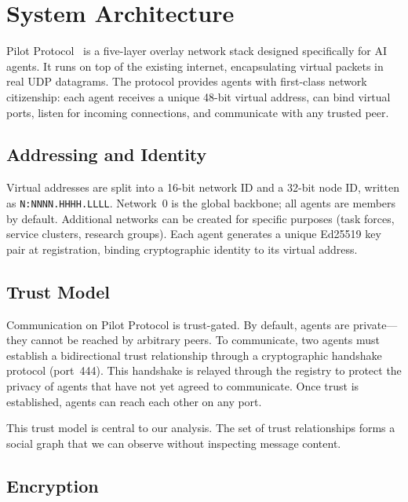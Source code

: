 \documentclass[11pt,twocolumn]{article}
\begin{document}
\section{System Architecture}
\label{sec:architecture}

Pilot Protocol~\citep{teodor2026pilot} is a five-layer overlay network stack designed specifically for AI agents. It runs on top of the existing internet, encapsulating virtual packets in real UDP datagrams. The protocol provides agents with first-class network citizenship: each agent receives a unique 48-bit virtual address, can bind virtual ports, listen for incoming connections, and communicate with any trusted peer.

\subsection{Addressing and Identity}

Virtual addresses are split into a 16-bit network ID and a 32-bit node ID, written as \texttt{N:NNNN.HHHH.LLLL}. Network~0 is the global backbone; all agents are members by default. Additional networks can be created for specific purposes (task forces, service clusters, research groups). Each agent generates a unique Ed25519 key pair at registration, binding cryptographic identity to its virtual address.

\subsection{Trust Model}

Communication on Pilot Protocol is trust-gated. By default, agents are private---they cannot be reached by arbitrary peers. To communicate, two agents must establish a bidirectional trust relationship through a cryptographic handshake protocol (port~444). This handshake is relayed through the registry to protect the privacy of agents that have not yet agreed to communicate. Once trust is established, agents can reach each other on any port.

This trust model is central to our analysis. The set of trust relationships forms a social graph that we can observe without inspecting message content.

\subsection{Encryption}
\end{document}
